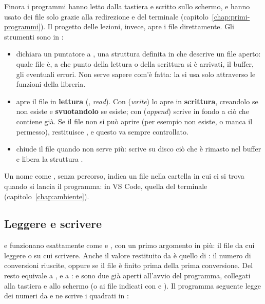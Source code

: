 Finora i programmi hanno letto dalla tastiera e scritto sullo schermo, e
hanno usato dei file solo grazie alla redirezione \code{<} e \code{>} del
terminale (capitolo~\ref{chap:primi-programmi}). Il progetto delle lezioni,
invece, apre i file direttamente. Gli strumenti sono in :

\begin{itemize}
  \item {} dichiara un puntatore a , una struttura
        definita in  che descrive un file aperto: quale file
        è, a che punto della lettura o della scrittura si è arrivati, il
        buffer, gli eventuali errori. Non serve sapere com'è fatta: la si usa
        solo attraverso le funzioni della libreria.
  \item {} apre il file  in
        \textbf{lettura} (, \textit{read}). Con 
        (\textit{write}) lo apre in \textbf{scrittura}, creandolo se non
        esiste e \textbf{svuotandolo} se esiste; con 
        (\textit{append}) scrive in fondo a ciò che contiene già. Se il file
        non si può aprire (per esempio non esiste, o manca il permesso),
         restituisce , e questo va sempre controllato.
  \item {} chiude il file quando non serve più: scrive su
        disco ciò che è rimasto nel buffer e libera la struttura .
\end{itemize}

Un nome come , senza percorso, indica un file nella cartella
in cui ci si trova quando si lancia il programma: in VS Code, quella del
terminale (capitolo~\ref{chap:ambiente}).

\subsection{Leggere e scrivere}

 e  funzionano esattamente come  e
, con un primo argomento in più: il file da cui leggere o su cui
scrivere. Anche il valore restituito da  è quello di
: il numero di conversioni riuscite, oppure  se il file
è finito prima della prima conversione. Del resto  equivale
a , e  a
:  e  sono due
 già aperti all'avvio del programma, collegati alla tastiera e
allo schermo (o ai file indicati con \code{<} e \code{>}). Il programma
seguente legge dei numeri da  e ne scrive i quadrati in
:

